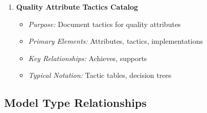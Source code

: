 \documentclass[11pt,letterpaper]{article}
\begin{document}
\begin{enumerate}[label=\textbf{MT\arabic*:}, leftmargin=2.5em]
    \item \textbf{Quality Attribute Tactics Catalog}
    \begin{itemize}[nosep]
        \item \textit{Purpose:} Document tactics for quality attributes
        \item \textit{Primary Elements:} Attributes, tactics, implementations
        \item \textit{Key Relationships:} Achieves, supports
        \item \textit{Typical Notation:} Tactic tables, decision trees
    \end{itemize}
\end{enumerate}

\subsection{Model Type Relationships}
\end{document}
